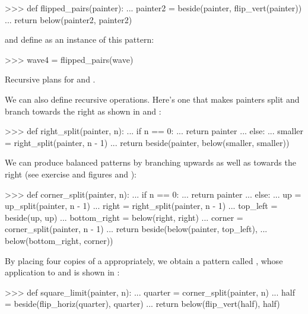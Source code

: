 \begin{codeBlock}
>>> def flipped_pairs(painter):
...     painter2 = beside(painter, flip_vert(painter))
...     return below(painter2, painter2)
\end{codeBlock}

\noindent
and define  as an instance of this pattern:

\begin{codeBlock}
>>> wave4 = flipped_pairs(wave)
\end{codeBlock}

\begin{imageFigure}{Recursive plans for  and
  .}
  \resizebox{\linewidth}{!}{}
\end{imageFigure}

\noindent
We can also define recursive operations.  Here's one that makes painters split
and branch towards the right as shown in 
and :

\begin{codeBlock}
>>> def right_split(painter, n):
...     if n == 0:
...         return painter
...     else:
...         smaller = right_split(painter, n - 1)
...         return beside(painter, below(smaller, smaller))
\end{codeBlock}

\noindent
We can produce balanced patterns by branching upwards as well as towards the
right (see exercise  and figures  and
):

\begin{codeBlock}
>>> def corner_split(painter, n):
...     if n == 0:
...         return painter
...     else:
...         up = up_split(painter, n - 1)
...         right = right_split(painter, n - 1)
...         top_left = beside(up, up)
...         bottom_right = below(right, right)
...         corner = corner_split(painter, n - 1)
...         return beside(below(painter, top_left),
...                       below(bottom_right, corner))
\end{codeBlock}

\noindent
By placing four copies of a  appropriately, we obtain a
pattern called , whose application to  and
 is shown in :

\begin{codeBlock}
>>> def square_limit(painter, n):
...     quarter = corner_split(painter, n)
...     half = beside(flip_horiz(quarter), quarter)
...     return below(flip_vert(half), half)
\end{codeBlock}

